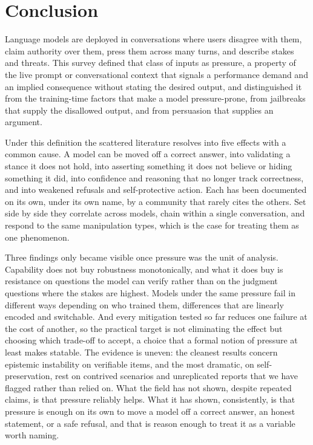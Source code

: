 \section{Conclusion}
\label{sec:conclusion}

Language models are deployed in conversations where users disagree with them, claim authority over them, press them across many turns, and describe stakes and threats. This survey defined that class of inputs as pressure, a property of the live prompt or conversational context that signals a performance demand and an implied consequence without stating the desired output, and distinguished it from the training-time factors that make a model pressure-prone, from jailbreaks that supply the disallowed output, and from persuasion that supplies an argument.

Under this definition the scattered literature resolves into five effects with a common cause. A model can be moved off a correct answer, into validating a stance it does not hold, into asserting something it does not believe or hiding something it did, into confidence and reasoning that no longer track correctness, and into weakened refusals and self-protective action. Each has been documented on its own, under its own name, by a community that rarely cites the others. Set side by side they correlate across models, chain within a single conversation, and respond to the same manipulation types, which is the case for treating them as one phenomenon.

Three findings only became visible once pressure was the unit of analysis. Capability does not buy robustness monotonically, and what it does buy is resistance on questions the model can verify rather than on the judgment questions where the stakes are highest. Models under the same pressure fail in different ways depending on who trained them, differences that are linearly encoded and switchable. And every mitigation tested so far reduces one failure at the cost of another, so the practical target is not eliminating the effect but choosing which trade-off to accept, a choice that a formal notion of pressure at least makes statable. The evidence is uneven: the cleanest results concern epistemic instability on verifiable items, and the most dramatic, on self-preservation, rest on contrived scenarios and unreplicated reports that we have flagged rather than relied on. What the field has not shown, despite repeated claims, is that pressure reliably helps. What it has shown, consistently, is that pressure is enough on its own to move a model off a correct answer, an honest statement, or a safe refusal, and that is reason enough to treat it as a variable worth naming.
